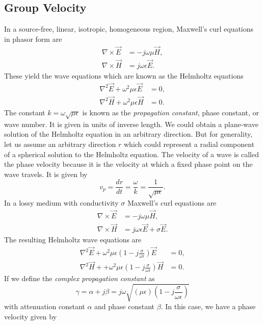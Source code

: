 \documentclass{article}
\begin{document}
		\subsection{Group Velocity}
In a source-free, linear, isotropic, homogeneous region, Maxwell's curl equations in phasor form are
\begin{align}
	\nabla\times\vec{E}&=-j\omega\mu\vec{H},\\
	\nabla\times\vec{H}&=j\omega\epsilon\vec{E}.
\end{align}
These yield the wave equations which are known as the Helmholtz equations
\begin{align}
	\nabla^2\vec{E}+\omega^2\mu\epsilon\vec{E}&=0,\\
	\nabla^2\vec{H}+\omega^2\mu\epsilon\vec{H}&=0.
\end{align}
The constant $k=\omega\sqrt{\mu\epsilon}$ is known as the \emph{propagation constant}, phase constant, or wave number. It is given in units of inverse length.
We could obtain a plane-wave solution of the Helmholtz equation in an arbitrary direction. But for generality, let us assume an arbitrary direction $r$ which could represent a radial component of a spherical solution to the Helmholtz equation. The velocity of a wave is called the phase velocity because it is the velocity at which a fixed phase point on the wave travels. It is given by
\begin{equation}
	v_p=\frac{dr}{dt}=\frac{\omega}{k}=\frac{1}{\sqrt{\mu\epsilon}}.
\end{equation}
In a lossy medium with conductivity $\sigma$ Maxwell's curl equations are
\begin{align}
	\nabla\times\vec{E}&=-j\omega\mu\vec{H},\\
	\nabla\times\vec{H}&=j\omega\epsilon\vec{E}+\sigma\vec{E}.
\end{align}
The resulting Helmholtz wave equations are
\begin{align}
	\nabla^2\vec{E}+\omega^2\mu\epsilon\left(1-j\frac{\sigma}{\omega\epsilon}\right)\vec{E}&=0,\\
	\nabla^2\vec{H}++\omega^2\mu\epsilon\left(1-j\frac{\sigma}{\omega\epsilon}\right)\vec{H}&=0.
\end{align}
If we define the \emph{complex propagation constant} as
\begin{equation}
	\gamma=\alpha+j\beta=j\omega\sqrt{(\mu\epsilon)\left(1-j\frac{\sigma}{\omega\epsilon}\right)}
\end{equation}
with attenuation constant $\alpha$ and phase constant $\beta$. In this case, we have a phase velocity given by
\end{document}
